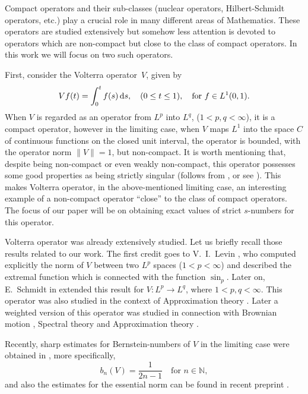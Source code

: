 \documentclass[10pt,reqno]{amsart}
\def\N{\mathbb{N}}
\def\d{{\fam0 d}}
\numberwithin{equation}{section}
\def\Li{{L^1}}
\def\LI{{L^1(0,1)}}
\begin{document}
Compact operators and their sub-classes (nuclear operators, Hilbert-Schmidt
operators, etc.)  play a crucial role in many different areas of Mathematics. 
These operators are studied extensively  but somehow less attention is devoted
to  operators which
are non-compact but close to the class of compact operators. In this work we
will focus on two such operators.

First, consider the Volterra operator~$V$,
given by
\begin{equation} \label{Vdef}
	Vf(t) = \int_0^t f(s)\,\d s,
	\quad (0\le t\le 1),
	\quad\text{for $f\in \LI$.}
\end{equation}
When $V$ is regarded as an operator
from $L^p$ into $L^q$, ($1<p,q<\infty$), it
is a compact operator, however
in the limiting case, when
$V$ maps $L^1$ into the space
$C$ of continuous functions on the closed unit interval,
the operator is
bounded, with the operator norm $\|V\|=1$, but non-compact.
It is worth mentioning that, despite being non-compact or even weakly non-compact, this
operator possesses some good properties as being strictly singular (follows from \cite{BG},
or see \cite{Lef17}).
This makes Volterra operator, in the above-mentioned limiting case, an
interesting example of a non-compact operator ``close'' to the class of compact
operators.
The focus of our paper will be on obtaining exact values of strict $s$-numbers
for this operator.

Volterra operator was already extensively studied. Let us briefly recall those results related to our work.
The first credit goes to V.~I.~Levin \citep{Levin},
who computed explicitly the norm of $V$ between two $L^p$ spaces ($1<p<\infty$)
and described the extremal function which is connected with the function $\sin_p$.
Later on, E.~Schmidt in \citep{Schmidt} extended this result for $V\colon L^p\to L^q$,
where $1<p,q<\infty$.
This  operator was also studied in the context of Approximation theory
\citep{PinkusConstrApprox,Kolm,Tih,TB,BS,PinkusBook}.
Later a weighted version of this operator was studied in connection with
Brownian motion \citep{LLBook}, Spectral theory \citep{EEBook,EEBook2}
and Approximation theory \citep{ELBook}.



Recently, sharp estimates for Bernstein-numbers of $V$ in the
limiting case were obtained in \citep[Theorem 2.2]{Lef17}, more specifically,
\begin{equation} \label{LefBer}
	b_n(V) = \frac{1}{2n-1}
		\quad\text{for $n\in\N$},
\end{equation}
and also the estimates for the essential norm can be found in recent
preprint \citep{Letal}.
\end{document}
